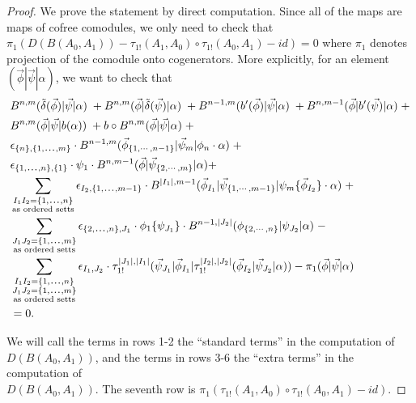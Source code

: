\begin{proof}
We prove the statement by direct computation. 
Since all of the maps are maps of cofree comodules, 
we only need to check that $\pi_1(D(B(A_0,A_1)) - 
\tau_{1!}(A_1,A_0)\circ \tau_{1!}(A_0,A_1) - id) = 0$ 
where $\pi_1$ denotes projection of the comodule 
onto cogenerators. More explicitly, for an element 
$(\vec{\phi}|\vec{\psi}|\alpha)$, we want to check that
\begin{equation} \label{eq:upsilon_homotopy}
\begin{aligned}
&B^{n,m} ( \tilde{\delta}(\vec{\phi}) | \vec{\psi} | \alpha ) \; + 
B^{n,m} ( \vec{\phi} | \tilde{\delta}(\vec{\psi}) | \alpha ) \; + 
B^{n-1,m} ( b^\prime(\vec{\phi}) | \vec{\psi} | \alpha ) \; + 
B^{n,m-1} ( \vec{\phi} | b^\prime(\vec{\psi}) | \alpha ) \; + \\
&B^{n,m} ( \vec{\phi} | \vec{\psi} | b(\alpha) ) \; + 
b \circ B^{n,m} ( \vec{\phi} | \vec{\psi} | \alpha ) \; + \\
%
& \epsilon_{\{n\},\{1,\smdots,m\}}\cdot
B^{n-1,m}(\vec{\phi}_{\{1,\cdots, n-1\}} |\vec{\psi}_{m} | \phi_{n} \cdot \alpha) \; + \\
%
& \epsilon_{\{1,\smdots,n\},\{1\}}\cdot
\psi_1 \cdot B^{n,m-1} ( \vec{\phi} | \vec{\psi}_{\{2,\cdots, m\}} | \alpha)  + \\ 
%
& \sum \limits_{\substack{
    I_1I_2 = \{1,\smdots,n\}\\
    \textrm{as ordered setts}}}
\epsilon_{I_2,\{1,\smdots,m-1\}}\cdot
B^{|I_1|,m-1}(\vec{\phi}_{I_1} | \vec{\psi}_{\{1,\cdots, m-1\}} | \psi_{m} \{\vec{\phi}_{I_2}\}\cdot \alpha ) \; + \\
%
& \sum \limits_{\substack{
    J_1J_2 = \{1,\smdots,m\}\\
    \textrm{as ordered setts}}}
\epsilon_{\{2,\smdots,n\},J_1}\cdot
\phi_1 \{ \psi_{J_1}\} \cdot B^{n-1,|J_2|}(\phi_{\{2,\cdots , n\}} | \psi_{J_2} | \alpha ) \; - \\
%
& \sum \limits_{\substack{
    I_1I_2 = \{1,\smdots,n\}\\
    J_1J_2 = \{1,\smdots,m\}\\
    \textrm{as ordered setts}}}
\epsilon_{I_1,J_2}\cdot
\tau_{1!}^{|J_1|,|I_1|} (\vec{\psi}_{J_1} | \vec{\phi}_{I_1} | \tau_{1!}^{|I_2|,|J_2|} (\vec{\phi}_{I_2} | \vec{\psi}_{J_2} | \alpha ))  - \pi_1(\vec{\phi} | \vec{\psi} | \alpha) \\
&= 0.
\end{aligned}
\end{equation}

We will call the terms in rows 1-2 the ``standard terms'' in the computation of $D(B(A_0,A_1))$, and the terms in rows 3-6 the ``extra terms'' in the computation of \\
$D(B(A_0,A_1))$. The seventh row is $\pi_1(\tau_{1!}(A_1,A_0)\circ \tau_{1!}(A_0,A_1) - id)$. 


\end{proof}
